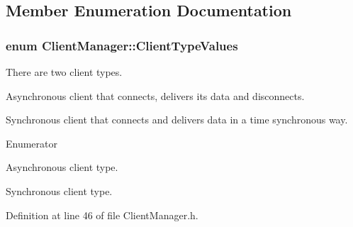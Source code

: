\subsection{Member Enumeration Documentation}
\hypertarget{class_client_manager_ac12239be9a30847f677a32910822d40b}{
\subsubsection[{Client\-Type\-Values}]{\setlength{\rightskip}{0pt plus 5cm}enum {\bf Client\-Manager\-::\-Client\-Type\-Values}\hspace{0.3cm}{\ttfamily [private]}}}\label{class_client_manager_ac12239be9a30847f677a32910822d40b}
There are two client types.
\begin{DoxyItemize}
\item Asynchronous client that connects, delivers its data and disconnects.
\item Synchronous client that connects and delivers data in a time synchronous way. 
\end{DoxyItemize}\begin{Desc}
\item[Enumerator]\par
\begin{description}
\item[{\em 
\hypertarget{class_client_manager_ac12239be9a30847f677a32910822d40ba5efa5897435cfd442d637beea251c85a}{Asynchronous\-Client}\label{class_client_manager_ac12239be9a30847f677a32910822d40ba5efa5897435cfd442d637beea251c85a}
}]Asynchronous client type. \item[{\em 
\hypertarget{class_client_manager_ac12239be9a30847f677a32910822d40bada4fe5ba56979f1deaf93b69d0a8fcae}{Synchronous\-Client}\label{class_client_manager_ac12239be9a30847f677a32910822d40bada4fe5ba56979f1deaf93b69d0a8fcae}
}]Synchronous client type. \end{description}
\end{Desc}


Definition at line 46 of file Client\-Manager.\-h.



